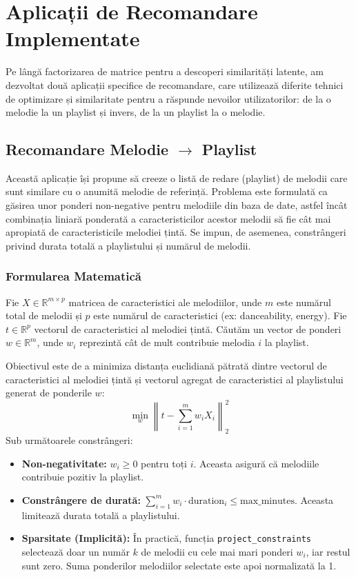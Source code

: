\documentclass[12pt,a4paper]{article}
\begin{document}
	\section{Aplicații de Recomandare Implementate}
	Pe lângă factorizarea de matrice pentru a descoperi similarități latente, am dezvoltat două aplicații specifice de recomandare, care utilizează diferite tehnici de optimizare și similaritate pentru a răspunde nevoilor utilizatorilor: de la o melodie la un playlist și invers, de la un playlist la o melodie.

	\subsection{Recomandare Melodie $\rightarrow$ Playlist}
	Această aplicație își propune să creeze o listă de redare (playlist) de melodii care sunt similare cu o anumită melodie de referință. Problema este formulată ca găsirea unor ponderi non-negative pentru melodiile din baza de date, astfel încât combinația liniară ponderată a caracteristicilor acestor melodii să fie cât mai apropiată de caracteristicile melodiei țintă. Se impun, de asemenea, constrângeri privind durata totală a playlistului și numărul de melodii.

	\subsubsection{Formularea Matematică}
	Fie $X \in \mathbb{R}^{m \times p}$ matricea de caracteristici ale melodiilor, unde $m$ este numărul total de melodii și $p$ este numărul de caracteristici (ex: danceability, energy). Fie $t \in \mathbb{R}^p$ vectorul de caracteristici al melodiei țintă. Căutăm un vector de ponderi $w \in \mathbb{R}^m$, unde $w_i$ reprezintă cât de mult contribuie melodia $i$ la playlist.

	Obiectivul este de a minimiza distanța euclidiană pătrată dintre vectorul de caracteristici al melodiei țintă și vectorul agregat de caracteristici al playlistului generat de ponderile $w$:
	\begin{equation}
		\min_{w} \left\| t - \sum_{i=1}^{m} w_i X_i \right\|_2^2
	\end{equation}
	Sub următoarele constrângeri:
	\begin{itemize}
		\item \textbf{Non-negativitate:} $w_i \ge 0$ pentru toți $i$. Aceasta asigură că melodiile contribuie pozitiv la playlist.
		\item \textbf{Constrângere de durată:} $\sum_{i=1}^{m} w_i \cdot \text{duration}_i \le \text{max\_minutes}$. Aceasta limitează durata totală a playlistului.
		\item \textbf{Sparsitate (Implicită):} În practică, funcția \texttt{project\_constraints} selectează doar un număr $k$ de melodii cu cele mai mari ponderi $w_i$, iar restul sunt zero. Suma ponderilor melodiilor selectate este apoi normalizată la 1.
	\end{itemize}
\end{document}

